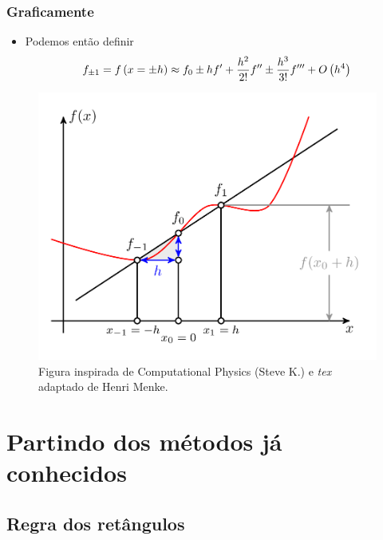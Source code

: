 \documentclass[xcolor=table]{beamer}
\begin{document}
\begin{frame}%

\frametitle{Graficamente}

\begin{itemize}
\item Podemos ent\~{a}o definir%
\[
f_{\pm 1}=f\left( x=\pm h\right) \approx f_{0}\pm hf^{\prime }+\frac{h^{2}}{%
2!}f^{\prime \prime }\pm \frac{h^{3}}{3!}f^{\prime \prime \prime }+O\left(
h^{4}\right) 
\]
\end{itemize}
\begin{figure}
	\includegraphics[scale=.16]{lista4_figurediferencafinita.png}
	\caption{Figura inspirada de Computational Physics (Steve K.) e \textit{tex} adaptado de Henri Menke.}
\end{figure}
\transboxout%
\end{frame}%

\section{Partindo dos m\'{e}todos j\'{a} conhecidos}

\subsection{Regra dos ret\^{a}ngulos}
\end{document}
